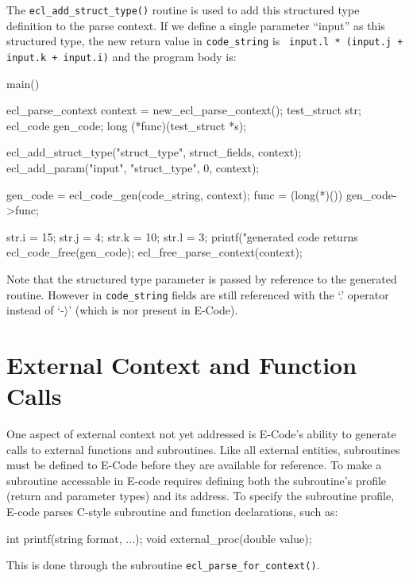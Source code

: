 \documentclass[11pt]{article}
\begin{document}
The {\tt ecl\_add\_struct\_type()} routine is used to add this structured type
definition to the parse context.  If we define a single parameter ``input'' as
this structured type, the new return value in {\tt code\_string} is {\tt
input.l * (input.j + input.k + input.i)} and the program body is:
\begin{Code}
main() {
    ecl_parse_context context = new_ecl_parse_context();
    test_struct str;
    ecl_code gen_code;
    long (*func)(test_struct *s);

    ecl_add_struct_type("struct_type", struct_fields, context);
    ecl_add_param("input", "struct_type", 0, context);

    gen_code = ecl_code_gen(code_string, context);
    func = (long(*)()) gen_code->func;

    str.i = 15;
    str.j = 4;
    str.k = 10;
    str.l = 3;
    printf("generated code returns %
	ecl_code_free(gen_code);
	ecl_free_parse_context(context);
}
\end{Code}
Note that the structured type parameter is passed by reference to the
generated routine.  However in {\tt code\_string} fields are still referenced
with the `.' operator instead of `-$\rangle$' (which is nor present in E-Code).

\section{External Context and Function Calls}

One aspect of external context not yet addressed is E-Code's ability to
generate calls to external functions and subroutines.  Like all external
entities, subroutines must be defined to E-Code before they are available for
reference.  To make a subroutine accessable in E-code requires defining both
the subroutine's profile (return and parameter types) and its address.  To
specify the subroutine profile, E-code parses C-style subroutine and function
declarations, such as:
\begin{Code}
int printf(string format, ...);
void external_proc(double value);
\end{Code}
This is done through the subroutine {\tt ecl\_parse\_for\_context()}.  
\end{document}
